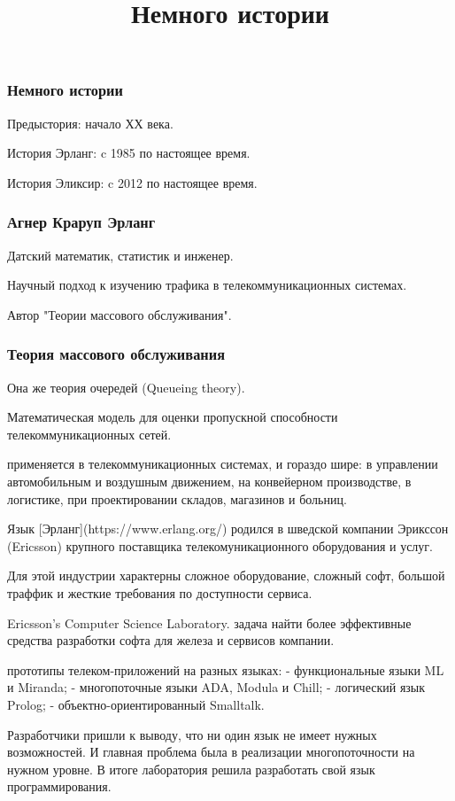 \documentclass[10pt]{beamer}
\title{Немного истории}
\begin{document}
\maketitle

\begin{frame}
\frametitle{Немного истории}
\centering
Предыстория: начало ХХ века.
\par \bigskip
История Эрланг: c 1985 по настоящее время.
\par \bigskip
История Эликсир: c 2012 по настоящее время.
\end{frame}


\begin{frame}
\frametitle{Агнер Краруп Эрланг}
\centering
Датский математик, статистик и инженер.
\par \bigskip
Научный подход к изучению трафика в телекоммуникационных системах.
\par \bigskip
Автор "Теории массового обслуживания".
\end{frame}

\begin{frame}
\frametitle{Теория массового обслуживания}
\centering
Она же теория очередей (Queueing theory).
\par \bigskip
Математическая модель для оценки пропускной способности телекоммуникационных сетей.
\end{frame}

применяется в телекоммуникационных системах,
и гораздо шире:
в управлении автомобильным и воздушным движением,
на конвейерном производстве,
в логистике,
при проектировании складов, магазинов и больниц.

Язык [Эрланг](https://www.erlang.org/) родился в шведской компании Эрикссон (Ericsson)
крупного поставщика телекомуникационного оборудования и услуг.

Для этой индустрии характерны
сложное оборудование,
сложный софт,
большой траффик
и жесткие требования по доступности сервиса.

Ericsson’s Computer Science Laboratory. 
задача найти более эффективные средства
разработки софта для железа и сервисов компании.

прототипы телеком-приложений на разных языках:
- функциональные языки ML и Miranda;
- многопоточные языки ADA, Modula и Chill;
- логический язык Prolog;
- объектно-ориентированный Smalltalk.

Разработчики пришли к выводу, что ни один язык не имеет нужных возможностей.
И главная проблема была в реализации многопоточности на нужном уровне.
В итоге лаборатория решила разработать свой язык программирования.
\end{document}

